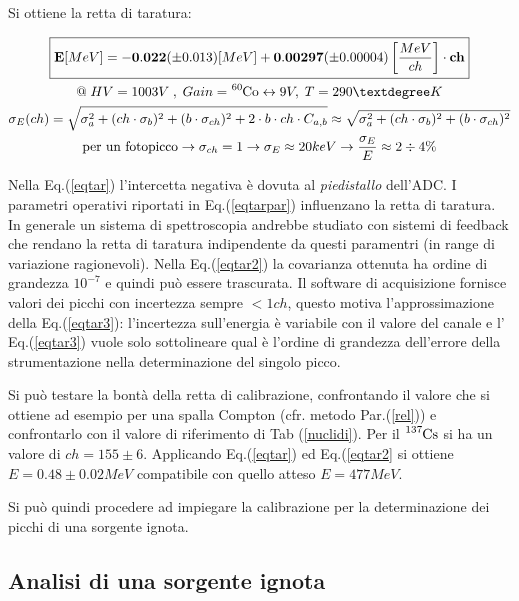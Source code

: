 \documentclass[12pt,a4paper,openright,twoside]{article}
\numberwithin{equation}{section} %
\begin{document}
Si ottiene la retta di taratura:

\begin{gather} \label{eqtar}
\boxed{ \mathbf{E} [MeV]=\mathbf{-0.022} (\pm 0.013) [MeV]+\mathbf{0.00297} (\pm 0.00004) \left[\frac{MeV}{ch}\right] \cdot \mathbf{ch}} \\ \label{eqtarpar}
\mathbf{@} \; HV = 1003V\; , \; Gain=\ce{^{60}_{}Co} \leftrightarrow 9V , \; T=290 °K\\ \label{eqtar2}
\sigma_E (ch)= \sqrt{\sigma_a^2 + (ch \cdot \sigma_b )^2 + (b\cdot \sigma_{ch})^2 + 2 \cdot b \cdot ch \cdot C_{a,b}} \approx \sqrt{\sigma_a^2 + (ch \cdot \sigma_b )^2 + (b\cdot \sigma_{ch})^2} \\\label{eqtar3}
\text{per un fotopicco} \rightarrow  \sigma_{ch} = 1 \rightarrow \sigma_E \approx 20keV \rightarrow  \frac{\sigma_E}{E} \approx 2 \div 4 \%
\end{gather}

Nella Eq.(\ref{eqtar}) l'intercetta negativa è dovuta al \textit{piedistallo} dell'ADC. \newline
I parametri operativi riportati in Eq.(\ref{eqtarpar}) influenzano la retta di taratura. In generale un sistema di spettroscopia andrebbe studiato con sistemi di feedback che rendano la retta di taratura indipendente da questi paramentri (in range di variazione ragionevoli). \newline
Nella Eq.(\ref{eqtar2}) la covarianza ottenuta ha ordine di grandezza $10^{-7}$ e quindi può essere trascurata.
Il software di acquisizione fornisce valori dei picchi con incertezza sempre $<1ch$, questo motiva l'approssimazione della Eq.(\ref{eqtar3}): l'incertezza sull'energia è variabile con il valore del canale e l' Eq.(\ref{eqtar3}) vuole solo sottolineare qual è l'ordine di grandezza dell'errore della strumentazione nella determinazione del singolo picco. 

Si può testare la bontà della retta di calibrazione, confrontando il valore che si ottiene ad esempio per una spalla Compton (cfr. metodo Par.(\ref{rel})) e confrontarlo con il valore di riferimento di Tab (\ref{nuclidi}). Per il $\ce{^{137}_{}Cs}$ si ha un valore di $ch=155 \pm 6$. Applicando Eq.(\ref{eqtar}) ed Eq.(\ref{eqtar2} si ottiene $E=0.48 \pm 0.02 MeV$ compatibile con quello atteso $E=477 MeV$.

Si può quindi procedere ad impiegare la calibrazione per la determinazione dei picchi di una sorgente ignota.

\pagebreak

\subsection{Analisi di una sorgente ignota}
\end{document}
